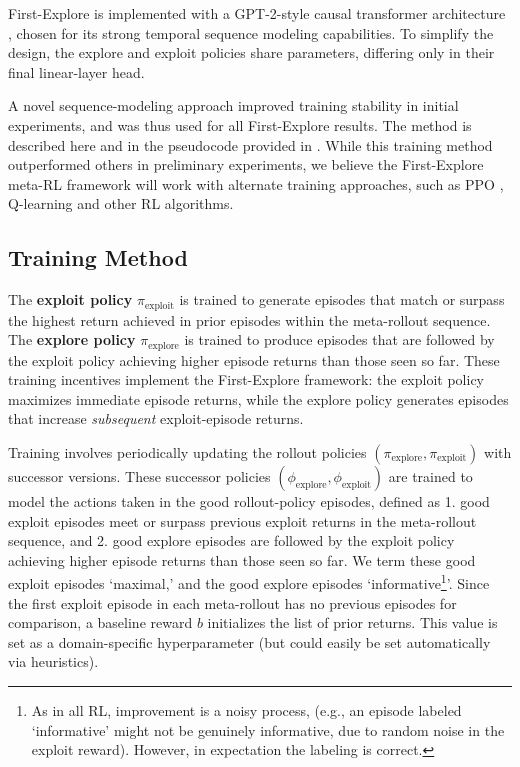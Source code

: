 \documentclass{article}
\begin{document}
First-Explore is implemented with a GPT-2-style causal transformer architecture \citep{radford2019language}, chosen for its strong temporal sequence modeling capabilities. To simplify the design, the explore and exploit policies share parameters, differing only in their final linear-layer head.

A novel sequence-modeling approach improved training stability in initial experiments, and was thus used for all First-Explore results. The method is described here and in the pseudocode provided in . While this training method outperformed others in preliminary experiments, we believe the First-Explore meta-RL framework will work with alternate training approaches, such as PPO \citep{schulman2017proximal}, Q-learning \citep{mnih2013playing} and other RL algorithms.

\subsection{Training Method}

The \textbf{exploit policy} \(\pi_{\text{exploit}}\) is 
trained to generate episodes that match or surpass the highest return achieved in prior episodes within the meta-rollout sequence.
%
The \textbf{explore policy} \(\pi_{\text{explore}}\) is trained to produce episodes that are followed by the exploit policy achieving higher episode returns than those seen so far.
These training incentives implement the First-Explore framework: the exploit policy maximizes immediate episode returns, while the explore policy generates episodes that increase \emph{subsequent} exploit-episode returns.

Training involves periodically updating the rollout policies \((\pi_{\text{explore}}, \pi_{\text{exploit}})\) with successor versions. These successor policies \((\phi_{\text{explore}},
\phi_{\text{exploit}})\) are trained to model the actions taken in the good rollout-policy episodes, defined as 1. good exploit episodes meet or surpass previous exploit returns in the meta-rollout sequence, and 2. good explore episodes are followed by the exploit policy achieving higher episode returns than those seen so far. We term these good exploit episodes `maximal,' and the good explore episodes `informative\footnote{As in all RL, improvement is a noisy process, (e.g., an episode labeled `informative' might not be genuinely informative, due to random noise in the exploit reward). However, in expectation the labeling is correct.}'. Since the first exploit episode in each meta-rollout has no previous episodes for comparison, a baseline reward \(b\) initializes the list of prior returns. This value is set as a domain-specific hyperparameter (but could easily be set automatically via heuristics).
\end{document}

